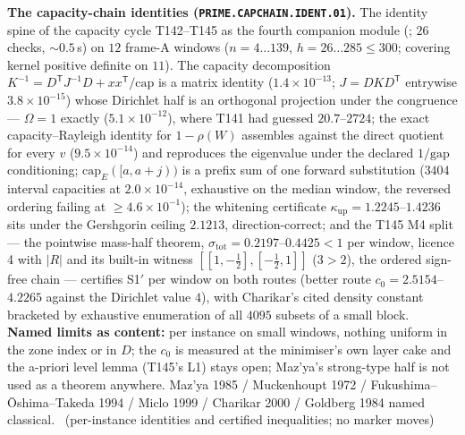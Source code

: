 \par\smallskip\noindent\textbf{The capacity-chain identities
(\texttt{PRIME.CAPCHAIN.IDENT.01}).}
The identity spine of the capacity cycle T142--T145 as the fourth companion
module (; $26$ checks, ${\sim}0.5$\,s)
on $12$ frame-A windows ($n=4\ldots139$, $h=26\ldots285\le300$; covering kernel
positive definite on $11$). The capacity decomposition
$K^{-1}=D^{\mathsf T}J^{-1}D+xx^{\mathsf T}/\mathrm{cap}$ is a matrix identity
($1.4\times10^{-13}$; $J=DKD^{\mathsf T}$ entrywise $3.8\times10^{-15}$) whose
Dirichlet half is an orthogonal projection under the congruence --- $\Omega=1$
exactly ($5.1\times10^{-12}$), where T141 had guessed $20.7$--$2724$; the exact
capacity--Rayleigh identity for $1-\rho(W)$ assembles against the direct
quotient for every $v$ ($9.5\times10^{-14}$) and reproduces the eigenvalue under
the declared $1/\mathrm{gap}$ conditioning; $\mathrm{cap}_E([a,a{+}j))$ is a
prefix sum of one forward substitution ($3404$ interval capacities at
$2.0\times10^{-14}$, exhaustive on the median window, the reversed ordering
failing at $\ge4.6\times10^{-1}$); the whitening certificate
$\kappa_{\mathrm{up}}=1.2245$--$1.4236$ sits under the Gershgorin ceiling
$2.1213$, direction-correct; and the T145 M4 split --- the pointwise mass-half
theorem, $\sigma_{\mathrm{tot}}=0.2197$--$0.4425<1$ per window, licence 4 with
$|R|$ and its built-in witness $[[1,-\tfrac12],[-\tfrac12,1]]$ ($3>2$), the
ordered sign-free chain --- certifies S1$'$ per window on both routes (better
route $c_0=2.5154$--$4.2265$ against the Dirichlet value $4$), with Charikar's
cited density constant bracketed by exhaustive enumeration of all $4095$
subsets of a small block.
\textbf{Named limits as content:} per instance on small windows, nothing
uniform in the zone index or in $D$; the $c_0$ is measured at the minimiser's
own layer cake and the a-priori level lemma (T145's L1) stays open; Maz'ya's
strong-type half is not used as a theorem anywhere. Maz'ya 1985 / Muckenhoupt
1972 / Fukushima--\=Oshima--Takeda 1994 / Miclo 1999 / Charikar 2000 / Goldberg
1984 named classical.
\mE\ (per-instance identities and certified inequalities; no marker moves)
\par\smallskip


